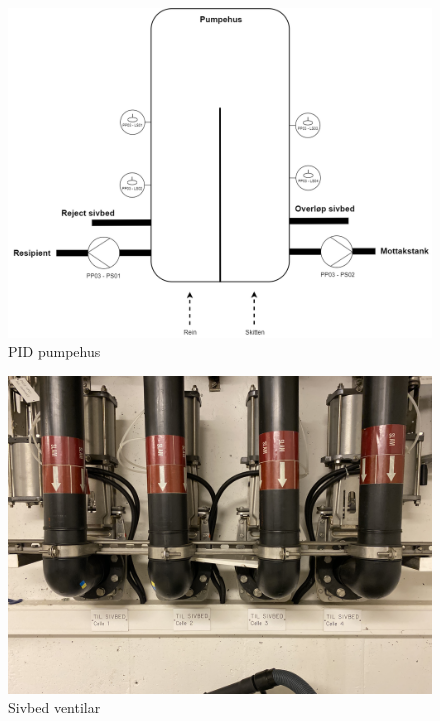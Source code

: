 \begin{figure}[htbp]
    \centering
    \includegraphics[width=1\textwidth]{Figurar/Pumpehus.drawio.png}
    \caption{\gls{PID} pumpehus}\label{fig:Pumpehus}
\end{figure}

\begin{figure}[htbp]
    \centering
    \includegraphics[width=1\textwidth]{Bilder/SivbedSande.jpg}
    \caption{Sivbed ventilar}\label{fig:SivbedVentilar}
\end{figure}

\newpage



